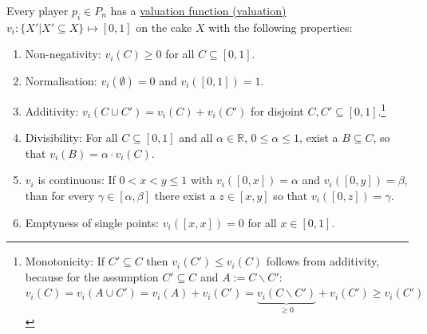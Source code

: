 Every player $p_i\in P_n$ has a \underline{valuation function (valuation)} $v_i:\{X'|X' \subseteq X\} \mapsto [0,1]$ on the cake $X$ with the following properties:
\begin{enumerate}
\item Non-negativity: $v_i(C)\geq 0$ for all $C\subseteq [0,1].$
\item Normalisation: $v_i(\emptyset)=0$ and $v_i([0,1])=1.$
\item Additivity: $v_i(C \cup C')=v_i(C)+v_i(C')$ for disjoint
$C,C'\subseteq [0,1].$\footnote{Monotonicity: If $C' \subseteq C$ then $v_i(C') \leq v_i(C)$ follows from additivity, because for the assumption $C' \subseteq C$ and $A:=C\backslash C'$: $v_i(C)=v_i(A\cup C')=v_i(A)+v_i(C')=\underbrace{v_i(C\backslash C')}_{\geq 0}+v_i(C')\geq v_i(C')$}
\item Divisibility: For all $C\subseteq [0,1]$ and all $\alpha \in
\mathbb{R}$, $0\leq \alpha \leq 1$, exist a $B\subseteq C$, so that
$v_i(B)=\alpha \cdot v_i(C).$
\item  $v_i$ is continuous: If $0<x<y\leq 1$ with $v_i([0,x])=\alpha$ and
$v_i([0,y])=\beta$, than for every $\gamma \in [\alpha,\beta]$ there exist a $z \in [x,y]$ so that $v_i([0,z])=\gamma.$
\item Emptyness of single points:  $v_i([x,x])=0$ for all $x\in [0,1].$
\end{enumerate}

